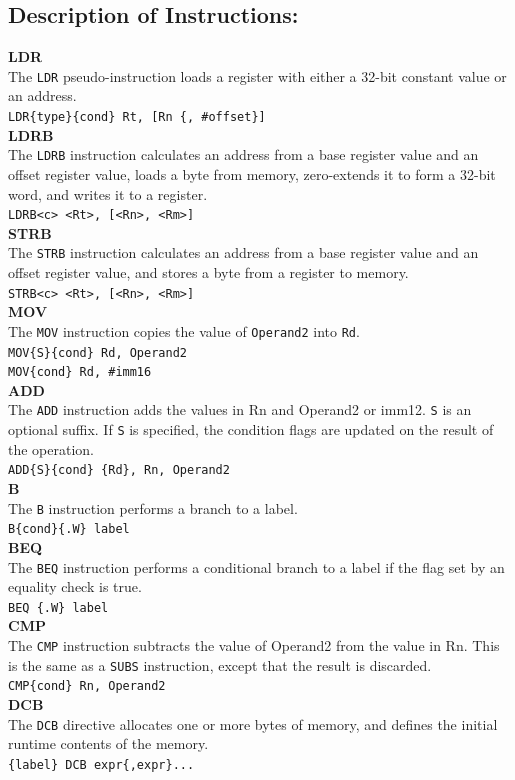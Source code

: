 \documentclass[12pt]{article}
\begin{document}
\subsection{Description of Instructions:}
\textbf{LDR}\\
The \verb|LDR| pseudo-instruction loads a register with either a 32-bit constant value or an address.\\
\verb|LDR{type}{cond} Rt, [Rn {, #offset}]| \\
\textbf{LDRB}\\
The \verb|LDRB| instruction calculates an address from a base register value and an offset register value, loads a byte from memory, zero-extends it to form a 32-bit word, and writes it to a register. \\
\verb|LDRB<c> <Rt>, [<Rn>, <Rm>]|\\
\textbf{STRB}\\
The \verb|STRB| instruction calculates an address from a base register value and an offset register value, and stores a byte from a register to memory. \\
\verb|STRB<c> <Rt>, [<Rn>, <Rm>]|\\
\textbf{MOV}\\The \verb|MOV| instruction copies the value of \verb|Operand2| into \verb|Rd|.\\
\verb|MOV{S}{cond} Rd, Operand2|\\
\verb|MOV{cond} Rd, #imm16|\\
\textbf{ADD}\\
The \verb|ADD| instruction adds the values in Rn and Operand2 or imm12. \verb|S| is an optional suffix. If \verb|S| is specified, the condition flags are updated on the result of the operation.\\
\verb|ADD{S}{cond} {Rd}, Rn, Operand2|\\
\textbf{B}\\
The \verb|B| instruction performs a branch to a label.\\
\verb|B{cond}{.W} label|\\
\textbf{BEQ}\\
The \verb|BEQ| instruction performs a conditional branch to a label if the flag set by an equality check is true.\\
\verb|BEQ {.W} label|\\
\textbf{CMP}\\
The \verb|CMP| instruction subtracts the value of Operand2 from the value in Rn. This is the same as a \verb|SUBS| instruction, except that the result is discarded.\\
\verb|CMP{cond} Rn, Operand2|\\
\textbf{DCB}\\
The \verb|DCB| directive allocates one or more bytes of memory, and defines the initial runtime contents of the memory.\\
\verb|{label} DCB expr{,expr}...|\\
\pagebreak
\end{document}
